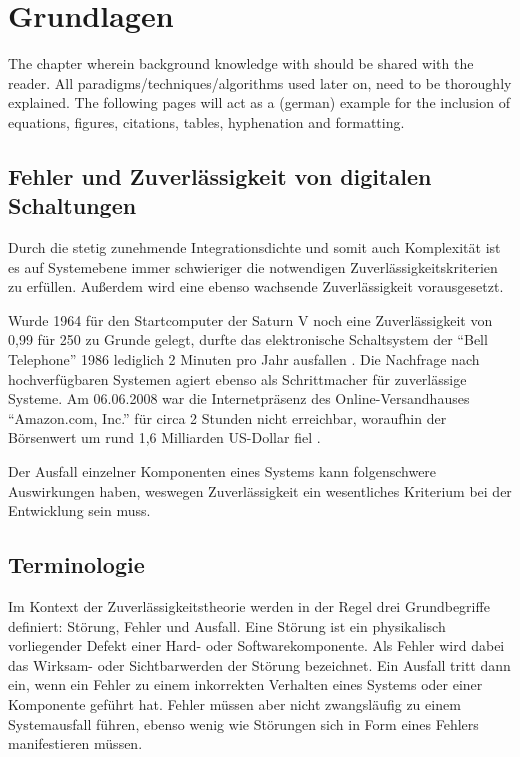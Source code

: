 \chapter{Grundlagen}
\label{chap:grundlagen}

The chapter wherein background knowledge with should be shared with the reader. All paradigms/techniques/algorithms used later on, need to be thoroughly explained.
The following pages will act as a (german) example for the inclusion of equations, figures, citations, tables, hyphenation and formatting.

\section{Fehler und Zuverlässigkeit von digitalen Schaltungen}
\label{sec:fehler_zuverlässigkeit}
Durch die stetig zunehmende Integrationsdichte und somit auch
Komplexität ist es auf Systemebene immer schwieriger die notwendigen
Zuverlässigkeitskriterien zu erfüllen. Außerdem wird eine ebenso
wachsende Zuverlässigkeit vorausgesetzt. 

Wurde 1964 für den Startcomputer der Saturn V noch eine
Zuverlässigkeit von 0,99 für \unit{250}{\hour} zu Grunde gelegt,
durfte das elektronische Schaltsystem der ``Bell Telephone'' 1986 lediglich
2 Minuten pro Jahr ausfallen \cite[S. xiii]{lala1985}. Die Nachfrage
nach hochverfügbaren Systemen agiert ebenso als Schrittmacher für
zuverlässige Systeme. Am 06.06.2008 war die Internetpräsenz des
Online-Versandhauses ``Amazon.com, Inc.'' für circa 2 Stunden nicht
erreichbar, woraufhin der Börsenwert um rund 1,6 Milliarden US-Dollar
fiel \cite{spiegel08}.

Der Ausfall einzelner Komponenten eines Systems kann folgenschwere
Auswirkungen haben, weswegen Zuverlässigkeit ein wesentliches
Kriterium bei der Entwicklung sein muss.

\section{Terminologie}
\label{sec:grundlagen_zuverlässigkeit_terminologie}

Im Kontext der Zuverlässigkeitstheorie werden in der Regel drei
Grundbegriffe definiert: Störung, Fehler und Ausfall.
Eine Störung ist ein physikalisch vorliegender Defekt einer Hard-
oder Softwarekomponente. Als Fehler wird dabei das Wirksam- oder
Sichtbarwerden der Störung bezeichnet. Ein Ausfall tritt dann ein,
wenn ein Fehler zu einem inkorrekten Verhalten eines Systems oder einer Komponente geführt
hat. Fehler müssen aber nicht zwangsläufig zu einem Systemausfall
führen, ebenso wenig wie Störungen sich in Form eines Fehlers
manifestieren müssen.

